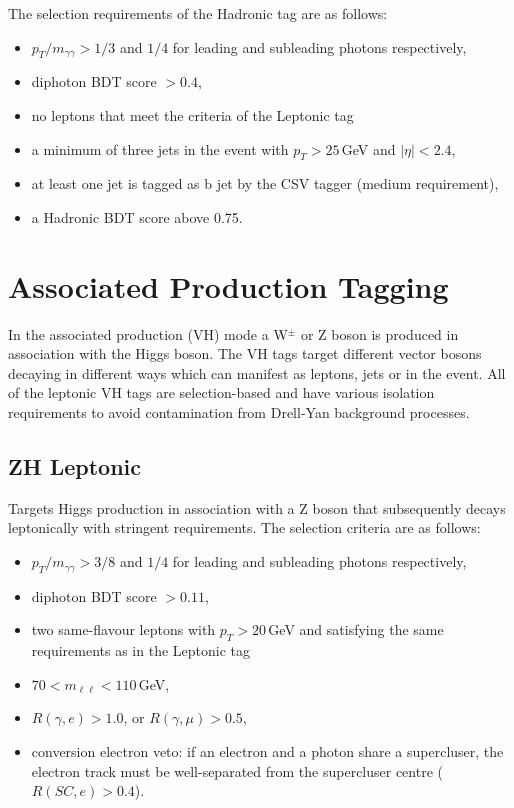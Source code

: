 The selection requirements of the \ttH Hadronic tag are as follows:
\begin{itemize}[leftmargin=.5in,noitemsep]
    \item $p_{T}/m_{\gamma\gamma} > 1/3$ and $1/4$ for leading and subleading photons respectively,
    \item diphoton BDT score $> 0.4$,
    \item no leptons that meet the criteria of the \ttH Leptonic tag
    \item a minimum of three jets in the event with $p_{T} > 25$\,GeV and $|\eta| < 2.4$,
    \item at least one jet is tagged as b jet by the CSV tagger (medium requirement),
    \item a \ttH Hadronic BDT score above 0.75.
\end{itemize}











\section{Associated Production Tagging}
In the associated production (VH) mode a W$^{\pm}$ or Z boson is produced in association with the Higgs boson. The VH tags target different vector bosons decaying in different ways which can manifest as leptons, jets or \MET in the event.
All of the leptonic VH tags are selection-based and have various isolation requirements to avoid contamination from Drell-Yan background processes.

\subsection{ZH Leptonic}
Targets Higgs production in association with a Z boson that subsequently decays leptonically with stringent requirements. The selection criteria are as follows:
\begin{itemize}[leftmargin=.5in,noitemsep]
    \item $p_{T}/m_{\gamma\gamma} > 3/8$ and $1/4$ for leading and subleading photons respectively,
    \item diphoton BDT score $> 0.11$,
    \item two same-flavour leptons with $p_T > 20$\,GeV and satisfying the same requirements as in the \ttH Leptonic tag
    \item $70 < m_{\ell\ell} < 110$\,GeV,
    \item $R(\gamma,e) > 1.0$, or $R(\gamma,\mu) > 0.5$,
    \item conversion electron veto: if an electron and a photon share a supercluser, the electron track must be well-separated from the supercluser centre ($R(SC,e) > 0.4$).
\end{itemize}


